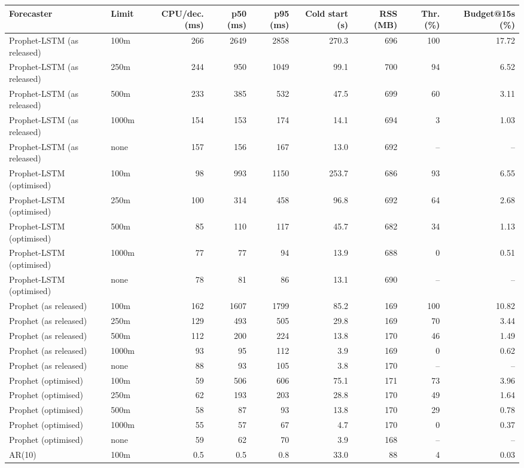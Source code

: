\begin{tabular}{llrrrrrrr}
\toprule
Forecaster & Limit & CPU/dec. (ms) & p50 (ms) & p95 (ms) & Cold start (s) & RSS (MB) & Thr. (\%) & Budget@15s (\%) \\
\midrule
Prophet-LSTM (as released) & 100m & 266 & 2649 & 2858 & 270.3 & 696 & 100 & 17.72 \\
Prophet-LSTM (as released) & 250m & 244 & 950 & 1049 & 99.1 & 700 & 94 & 6.52 \\
Prophet-LSTM (as released) & 500m & 233 & 385 & 532 & 47.5 & 699 & 60 & 3.11 \\
Prophet-LSTM (as released) & 1000m & 154 & 153 & 174 & 14.1 & 694 & 3 & 1.03 \\
Prophet-LSTM (as released) & none & 157 & 156 & 167 & 13.0 & 692 & -- & -- \\
Prophet-LSTM (optimised) & 100m & 98 & 993 & 1150 & 253.7 & 686 & 93 & 6.55 \\
Prophet-LSTM (optimised) & 250m & 100 & 314 & 458 & 96.8 & 692 & 64 & 2.68 \\
Prophet-LSTM (optimised) & 500m & 85 & 110 & 117 & 45.7 & 682 & 34 & 1.13 \\
Prophet-LSTM (optimised) & 1000m & 77 & 77 & 94 & 13.9 & 688 & 0 & 0.51 \\
Prophet-LSTM (optimised) & none & 78 & 81 & 86 & 13.1 & 690 & -- & -- \\
Prophet (as released) & 100m & 162 & 1607 & 1799 & 85.2 & 169 & 100 & 10.82 \\
Prophet (as released) & 250m & 129 & 493 & 505 & 29.8 & 169 & 70 & 3.44 \\
Prophet (as released) & 500m & 112 & 200 & 224 & 13.8 & 170 & 46 & 1.49 \\
Prophet (as released) & 1000m & 93 & 95 & 112 & 3.9 & 169 & 0 & 0.62 \\
Prophet (as released) & none & 88 & 93 & 105 & 3.8 & 170 & -- & -- \\
Prophet (optimised) & 100m & 59 & 506 & 606 & 75.1 & 171 & 73 & 3.96 \\
Prophet (optimised) & 250m & 62 & 193 & 203 & 28.8 & 170 & 49 & 1.64 \\
Prophet (optimised) & 500m & 58 & 87 & 93 & 13.8 & 170 & 29 & 0.78 \\
Prophet (optimised) & 1000m & 55 & 57 & 67 & 4.7 & 170 & 0 & 0.37 \\
Prophet (optimised) & none & 59 & 62 & 70 & 3.9 & 168 & -- & -- \\
AR(10) & 100m & 0.5 & 0.5 & 0.8 & 33.0 & 88 & 4 & 0.03 \\

\end{tabular}
